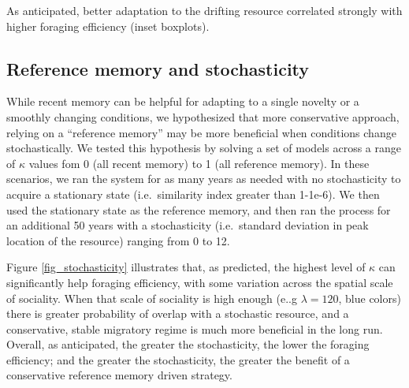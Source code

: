 \documentclass[utf8]{frontiersSCNS} %
\begin{document}
As anticipated, better adaptation to the drifting resource correlated strongly with higher foraging efficiency (inset boxplots).

\subsection{Reference memory and stochasticity}

While recent memory can be helpful for adapting to a single novelty or a smoothly changing conditions, we hypothesized that more conservative approach, relying on a ``reference memory'' may be more beneficial when conditions change stochastically. We tested this hypothesis by solving a set of models across a range of $\kappa$ values fom 0 (all recent memory) to 1 (all reference memory). In these scenarios, we ran the system for as many years as needed with no stochasticity to acquire a stationary state (i.e.~similarity index greater than 1-1e-6). We then used the stationary state as the reference memory, and then ran the process for an additional 50 years with a stochasticity (i.e.~standard deviation in peak location of the resource) ranging from 0 to 12.

Figure \ref{fig_stochasticity} illustrates that, as predicted, the highest level of $\kappa$ can significantly help foraging efficiency, with some variation across the spatial scale of sociality. When that scale of sociality is high enough (e..g $\lambda = 120$, blue colors) there is greater probability of overlap with a stochastic resource, and a conservative, stable migratory regime is much more beneficial in the long run. Overall, as anticipated, the greater the stochasticity, the lower the foraging efficiency; and the greater the stochasticity, the greater the benefit of a conservative reference memory driven strategy.
\end{document}
